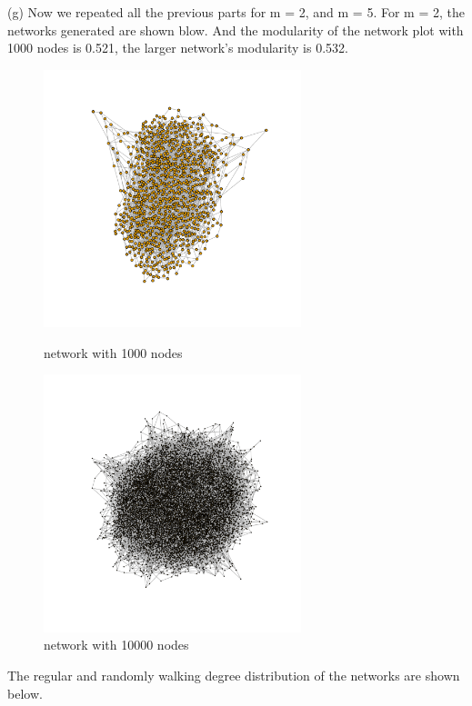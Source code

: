 \documentclass[draftcls,12pt,onecolumn]{IEEEtran}
\begin{document}
(g) Now we repeated all the previous parts for m = 2, and m = 5. 
 For m = 2, the networks generated are shown blow. And the modularity of the network plot with 1000 nodes is 0.521, the larger network's modularity is 0.532.
\begin{figure}[htbp]
\centering
\begin{minipage}[t]{0.48\textwidth}
\centering
\includegraphics[width=7.5cm]{img/2_g_1_network}
\caption{network with 1000 nodes}
\end{minipage}
\begin{minipage}[t]{0.48\textwidth}
\centering
\includegraphics[width=7.5cm]{img/2_g_1_network2}
\caption{network with 10000 nodes}
\end{minipage}
\end{figure}
The regular and randomly walking degree distribution of the networks are shown below.
\end{document}
